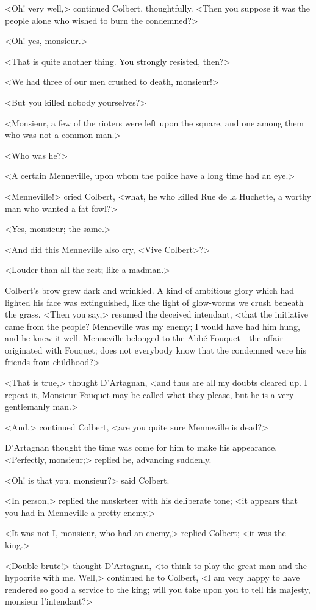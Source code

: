 <Oh! very well,> continued Colbert, thoughtfully. <Then you suppose it was the people alone who wished to burn the condemned?>

<Oh! yes, monsieur.>

<That is quite another thing. You strongly resisted, then?>

<We had three of our men crushed to death, monsieur!>

<But you killed nobody yourselves?>

<Monsieur, a few of the rioters were left upon the square, and one among them who was not a common man.>

<Who was he?>

<A certain Menneville, upon whom the police have a long time had an eye.>

<Menneville!> cried Colbert, <what, he who killed Rue de la Huchette, a worthy man who wanted a fat fowl?>

<Yes, monsieur; the same.>

<And did this Menneville also cry, <Vive Colbert>?>

<Louder than all the rest; like a madman.>

Colbert's brow grew dark and wrinkled. A kind of ambitious glory which had lighted his face was extinguished, like the light of glow-worms we crush beneath the grass. <Then you say,> resumed the deceived intendant, <that the initiative came from the people? Menneville was my enemy; I would have had him hung, and he knew it well. Menneville belonged to the Abbé Fouquet—the affair originated with Fouquet; does not everybody know that the condemned were his friends from childhood?>

<That is true,> thought D'Artagnan, <and thus are all my doubts cleared up. I repeat it, Monsieur Fouquet may be called what they please, but he is a very gentlemanly man.>

<And,> continued Colbert, <are you quite sure Menneville is dead?>

D'Artagnan thought the time was come for him to make his appearance. <Perfectly, monsieur;> replied he, advancing suddenly.

<Oh! is that you, monsieur?> said Colbert.

<In person,> replied the musketeer with his deliberate tone; <it appears that you had in Menneville a pretty enemy.>

<It was not I, monsieur, who had an enemy,> replied Colbert; <it was the king.>

<Double brute!> thought D'Artagnan, <to think to play the great man and the hypocrite with me. Well,> continued he to Colbert, <I am very happy to have rendered so good a service to the king; will you take upon you to tell his majesty, monsieur l'intendant?>

